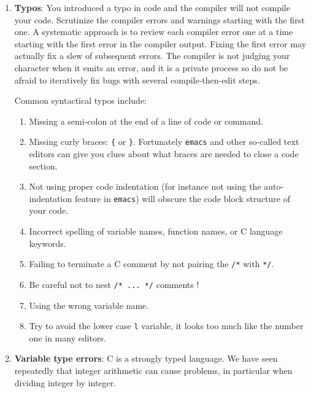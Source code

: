\begin{enumerate}
   
   \item {\bf Typos}: You introduced a typo in code and the compiler will not compile your code. Scrutinize the compiler errors and warnings starting with the first one.  A systematic approach is to review each compiler error one at a time starting with the first error in the compiler output. Fixing the first error may actually fix a slew of subsequent errors. The compiler is not judging your character when it emits an error, and it is a private process so do not be afraid to iteratively fix bugs with several compile-then-edit steps.
   
   Common syntactical typos include:
   \begin{enumerate}
       \item Missing a semi-colon at the end of a line of code or command.
       \item Missing curly braces: \texttt{\{} or \texttt{\}}. Fortunately \texttt{emacs} and other so-called text editors can give you clues about what braces are needed to close a code section.
       \item Not using proper code indentation (for instance not using the auto-indentation feature in \texttt{emacs}) will obscure the code block structure of your code.
       \item Incorrect spelling of variable names, function names, or C language keywords.
       \item Failing to terminate a C comment by not pairing the \texttt{/*} with \texttt{*/}. 
       \item Be careful not to nest \texttt{/* ... */}  comments !
       \item Using the wrong variable name. 
       \item Try to avoid the lower case \texttt{l} variable, it looks too much like the number one in many editors.
    \end{enumerate}
       
    \item {\bf Variable type errors}: C is a strongly typed language. We have seen repeatedly that integer arithmetic can cause problems, in particular when dividing integer by integer. 
       

\end{enumerate}
